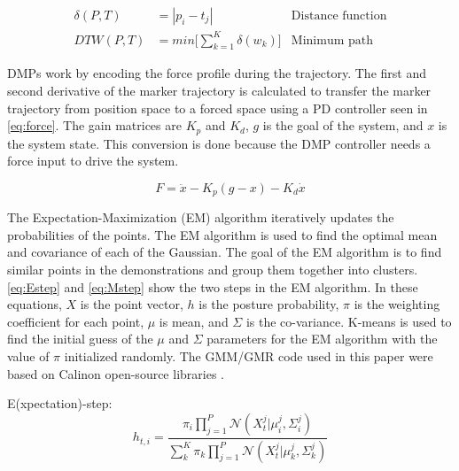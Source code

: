 \begin{equation} 
    \begin{aligned} 
         \delta (P,T) &= | p_i - t_j| & \text{Distance function} \\ 
        DTW(P,T) &= min \Bigg[ \sum_{k=1}^{K} \delta (w_k) \Bigg] & \text{Minimum path} 
    \end{aligned} 
    \label{eq:DTW} 
\end{equation} 


DMPs work by encoding the force profile during the trajectory. The first and second derivative of the marker trajectory is calculated to transfer the marker trajectory from position space to a forced space using a PD controller seen in \autoref{eq:force}. The gain matrices are $K_p$ and $K_d$, $g$ is the goal of the system, and $x$ is the system state. This conversion is done because the DMP controller needs a force input to drive the system.

\begin{equation}
    F = \ddot{x} - K_p (g - x) - K_d\dot{x}
    \label{eq:force}
\end{equation}


The Expectation-Maximization (EM) algorithm iteratively updates the probabilities of the points. The EM algorithm is used to find the optimal mean and covariance of each of the Gaussian. The goal of the EM algorithm is to find similar points in the demonstrations and group them together into clusters. \autoref{eq:Estep} and \autoref{eq:Mstep} show the two steps in the EM algorithm. In these equations, $X$ is the point vector, $h$ is the posture probability, $\pi$ is the weighting coefficient for each point, $\mu$ is mean, and $ \Sigma $ is the co-variance.  K-means is used to find the initial guess of the $\mu$ and $\Sigma$ parameters for the EM algorithm with the value of $\pi$ initialized randomly. The GMM/GMR code used in this paper were based on Calinon open-source libraries \cite{Calinon19MM} \cite{CalinonLee19} \cite{Calinon16JIST}. 

E(xpectation)-step: 
\begin{equation} 
     h_{t,i} = \frac{\pi_i \prod_{j=1}^{P} \mathcal{N}(X_t^j | \mu_i^j , \Sigma_i^j )}{ \sum_k^K \pi_k \prod_{j=1}^{P} \mathcal{N}(X_t^j | \mu_k^j , \Sigma_k^j ) } 
     \label{eq:Estep} 
\end{equation}{} 

